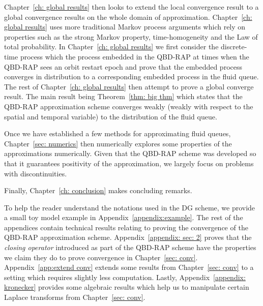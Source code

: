 Chapter~\ref{ch: global results} then looks to extend the local convergence result to a global convergence results on the whole domain of approximation. Chapter~\ref{ch: global results} uses more traditional Markov process arguments which rely on properties such as the strong Markov property, time-homogeneity and the Law of total probability. In Chapter~\ref{ch: global results} we first consider the discrete-time process which the process embedded in the QBD-RAP at times when the QBD-RAP sees an orbit restart epoch and prove that the embedded process converges in distribution to a corresponding embedded process in the fluid queue. The rest of Chapter~\ref{ch: global results} then attempt to prove a global converge result. The main result being Theorem~\ref{thm: big thm} which states that the QBD-RAP approximation scheme converges weakly (weakly with respect to the spatial and temporal variable) to the distribution of the fluid queue. 

Once we have established a few methods for approximating fluid queues, Chapter~\ref{sec: numerics} then numerically explores some properties of the approximations numerically. Given that the QBD-RAP scheme was developed so that it guarantees positivity of the approximation, we largely focus on problems with discontinuities. 

Finally, Chapter~\ref{ch: conclusion} makes concluding remarks. 

To help the reader understand the notations used in the DG scheme, we provide a small toy model example in Appendix~\ref{appendix:example}. The rest of the appendices contain technical results relating to proving the convergence of the QBD-RAP approximation scheme. Appendix~\ref{appendix: sec: 2} proves that the \emph{closing operator} introduced as part of the QBD-RAP scheme have the properties we claim they do to prove convergence in Chapter~\ref{sec: conv}. Appendix~\ref{app:extend conv} extends some results from Chapter~\ref{sec: conv} to a setting which requires slightly less computation. Lastly, Appendix~\ref{appendix: kronecker} provides some algebraic results which help us to manipulate certain Laplace transforms from Chapter~\ref{sec: conv}.
